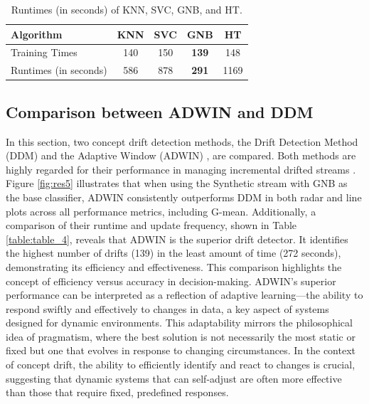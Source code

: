 	
\begin{table}[t]
	\centering
	\caption{Runtimes (in seconds) of KNN, SVC, GNB, and HT.}
	\begin{tabular}{|l|c|c|c|c|}
	\hline
	\textbf{Algorithm}     & \textbf{KNN} & \textbf{SVC} & \textbf{GNB} & \textbf{HT} \\ \hline
		Training Times         & 140          & 150          & \textbf{139} & 148         \\ \hline
		Runtimes (in seconds)         & 586          & 878          & \textbf{291} & 1169        \\ \hline
	\end{tabular}
	\label{table:table_3}
	\end{table}


\subsection{Comparison between ADWIN and DDM}
\label{sec:compared_drift_detector}
In this section, two concept drift detection methods, the Drift Detection Method (DDM) \cite{gama2004learning} and the Adaptive Window (ADWIN) \cite{gama2004learning, adams2023explainable}, are compared. Both methods are highly regarded for their performance in managing incremental drifted streams \cite{gama2004learning, adams2023explainable, madkour2023historical, baena2006early}. Figure \ref{fig:res5} illustrates that when using the Synthetic stream with GNB as the base classifier, ADWIN consistently outperforms DDM in both radar and line plots across all performance metrics, including G-mean. Additionally, a comparison of their runtime and update frequency, shown in Table \ref{table:table_4}, reveals that ADWIN is the superior drift detector. It identifies the highest number of drifts (139) in the least amount of time (272 seconds), demonstrating its efficiency and effectiveness. This comparison highlights the concept of efficiency versus accuracy in decision-making. ADWIN's superior performance can be interpreted as a reflection of adaptive learning—the ability to respond swiftly and effectively to changes in data, a key aspect of systems designed for dynamic environments. This adaptability mirrors the philosophical idea of pragmatism, where the best solution is not necessarily the most static or fixed but one that evolves in response to changing circumstances. In the context of concept drift, the ability to efficiently identify and react to changes is crucial, suggesting that dynamic systems that can self-adjust are often more effective than those that require fixed, predefined responses.

